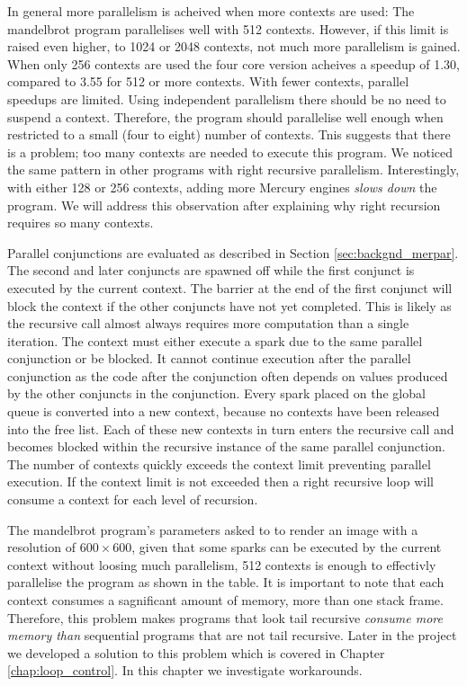 In general more parallelism is acheived when more contexts are used:
The mandelbrot program parallelises well with 512 contexts.
However,
if this limit is raised even higher,
to 1024 or 2048 contexts,
not much more parallelism is gained.
When only 256 contexts are used the four core version acheives a speedup
of 1.30,
compared to 3.55 for 512 or more contexts.
With fewer contexts, parallel speedups are limited.
Using independent parallelism there should be no need to suspend a context.
Therefore, the program should parallelise well enough when restricted to
a small (four to eight) number of contexts.
Tnis suggests that there is a problem;
too many contexts are needed to execute this program.
We noticed the same pattern in other programs with right recursive
parallelism.
Interestingly,
with either 128 or 256 contexts,
adding more Mercury engines \emph{slows down} the program.
We will address this observation after explaining why right recursion
requires so many contexts.

Parallel conjunctions are evaluated as described in Section
\ref{sec:backgnd_merpar}.
The second and later conjuncts are spawned off while the first conjunct is
executed by the current context.
The barrier at the end of the first conjunct will block the context if
the other conjuncts have not yet completed.
This is likely as the recursive call almost always requires more
computation than a single iteration.
The context must either execute a spark due to the same parallel
conjunction or be blocked.
It cannot continue execution after the parallel conjunction as the code
after the conjunction often depends on values produced by the other
conjuncts in the conjunction.
Every spark placed on the global queue is converted into a new context,
because no contexts have been released into the free list.
Each of these new contexts in turn enters the recursive call and
becomes blocked within the recursive instance of the same parallel
conjunction.
The number of contexts quickly exceeds the context limit preventing
parallel execution.
If the context limit is not exceeded then a right recursive loop will
consume a context for each level of recursion.

The mandelbrot program's parameters asked to to render an image with a
resolution of $600\times600$,
given that some sparks can be executed by the current context without
loosing much parallelism,
512 contexts is enough to effectivly parallelise the program as shown in
the table.
It is important to note that each context consumes a sagnificant amount
of memory, more than one stack frame.
Therefore,
this problem makes programs that look tail recursive
\emph{consume more memory than}
sequential programs that are not tail recursive.
Later in the project we developed a solution to this problem which is
covered in Chapter \ref{chap:loop_control}.
In this chapter we investigate workarounds.

